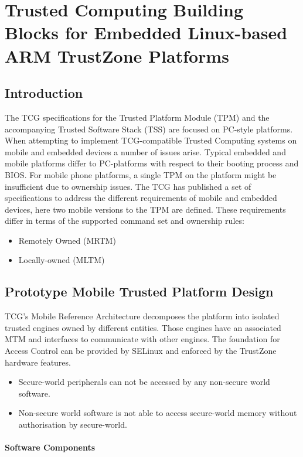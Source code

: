 \documentclass{article}
\begin{document}
\section{Trusted Computing Building Blocks for Embedded Linux-based ARM TrustZone Platforms}

\subsection{Introduction}

The TCG specifications for the Trusted Platform Module (TPM) and the accompanying Trusted Software Stack (TSS) are focused on PC-style platforms. When attempting to implement TCG-compatible Trusted Computing systems on mobile and embedded devices a number of issues arise. Typical embedded and mobile platforms differ to PC-platforms with respect to their booting process and BIOS. For mobile phone platforms, a single TPM on the platform might be insufficient due to ownership issues. The TCG has published a set of specifications to address the different requirements of mobile and embedded devices, here two mobile versions to the TPM are defined. These requirements differ in terms of the supported command set and ownership rules: \begin{itemize}
\item Remotely Owned (MRTM)
\item Locally-owned (MLTM)
\end{itemize}

\subsection{Prototype Mobile Trusted Platform Design}

TCG's Mobile Reference Architecture decomposes the platform into isolated trusted engines owned by different entities. Those engines have an associated MTM and interfaces to communicate with other engines. The foundation for Access Control can be provided by SELinux and enforced by the TrustZone hardware features. \begin{itemize}
\item Secure-world peripherals can not be accessed by any non-secure world software.
\item Non-secure world software is not able to access secure-world memory without authorisation by secure-world.
\end{itemize}

\paragraph{Software Components}
\end{document}

